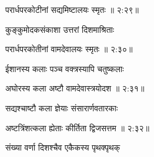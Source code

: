 
{\devanagarifont परार्धपरकोटीनां सद्यमिष्टालयः स्मृतः {॥ २:२९॥} \veg\dontdisplaylinenum }%

{\devanagarifont कुङ्कुमोदकसंकाशा उत्तरां दिशमाश्रिताः \thinspace{\dandab} \dontdisplaylinenum }%


{\devanagarifont परार्धपरकोतीनां वामदेवालयः स्मृतः {॥ २:३०॥} \veg\dontdisplaylinenum }%

{\devanagarifont ईशानस्य कलाः पञ्च वक्त्रस्यापि चतुष्कलाः \thinspace{\dandab} \dontdisplaylinenum }%


{\devanagarifont अघोरस्य कला अष्टौ वामदेवास्त्रयोदश {॥ २:३१॥} \veg\dontdisplaylinenum }%

{\devanagarifont सद्यश्चाष्टौ कला ज्ञेयाः संसारार्णवतारकाः \thinspace{\dandab} \dontdisplaylinenum }%


{\devanagarifont अष्टत्रिंशत्कला ह्येताः कीर्तिता द्विजसत्तम {॥ २:३२॥} \veg\dontdisplaylinenum }%

{\devanagarifont संख्या वर्णा दिशश्चैव एकैकस्य पृथक्पृथक् \thinspace{\dandab} \dontdisplaylinenum }%


